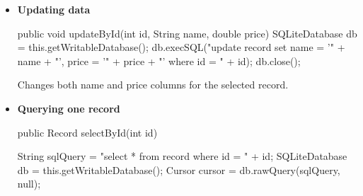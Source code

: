 \documentclass{report}
\begin{document}
\begin{itemize}
        \item \textbf{Updating data}
            \bigbreak \noindent 
            \begin{javacode}
                public void updateById(int id, String name, double price) {
                    SQLiteDatabase db = this.getWritableDatabase();
                    db.execSQL("update record set name = '" + name + "', price = '" + price + "' where id = " + id);
                    db.close();
                }
            \end{javacode}
            \bigbreak \noindent 
            Changes both name and price columns for the selected record.
        \item \textbf{Querying one record}
            \bigbreak \noindent 
            \begin{javacode}
                public Record selectById(int id) {
                    String sqlQuery = "select * from record where id = " + id;
                    SQLiteDatabase db = this.getWritableDatabase();
                    Cursor cursor = db.rawQuery(sqlQuery, null);

}
\end{javacode}
\end{itemize}
\end{document}
